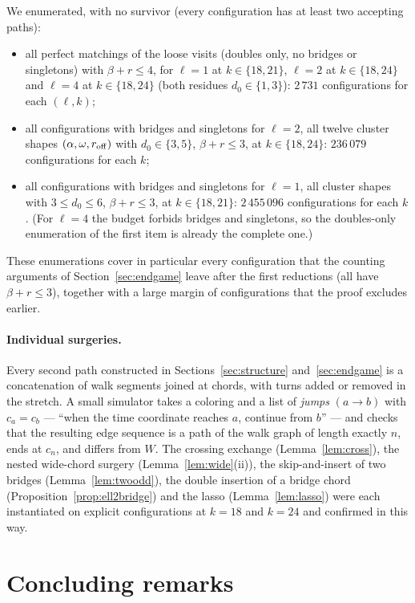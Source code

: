 \documentclass[11pt]{article}
\theoremstyle{definition}
\begin{document}
We enumerated, with no survivor (every configuration has at least two
accepting paths):
\begin{itemize}[leftmargin=1.6em,itemsep=1pt]
\item all perfect matchings of the loose visits (doubles only, no bridges or
singletons) with $\beta+r\le4$, for $\ell=1$ at $k\in\{18,21\}$, $\ell=2$
at $k\in\{18,24\}$ and $\ell=4$ at $k\in\{18,24\}$ (both residues
$d_0\in\{1,3\}$): $2\,731$ configurations for each $(\ell,k)$;
\item all configurations with bridges and singletons for $\ell=2$, all
twelve cluster shapes $(\alpha,\omega,r_{\rm off})$ with $d_0\in\{3,5\}$,
$\beta+r\le3$, at $k\in\{18,24\}$: $236\,079$ configurations for each $k$;
\item all configurations with bridges and singletons for $\ell=1$, all
cluster shapes with $3\le d_0\le6$, $\beta+r\le3$, at $k\in\{18,21\}$:
$2\,455\,096$ configurations for each $k$. (For $\ell=4$ the budget forbids
bridges and singletons, so the doubles-only enumeration of the first item is
already the complete one.)
\end{itemize}
These enumerations cover in particular every configuration that the
counting arguments of Section~\ref{sec:endgame} leave after the first
reductions (all have $\beta+r\le3$), together with a large margin of
configurations that the proof excludes earlier.

\paragraph{Individual surgeries.}
Every second path constructed in Sections~\ref{sec:structure}
and~\ref{sec:endgame} is a concatenation of walk segments joined at chords,
with turns added or removed in the stretch. A small simulator takes a
coloring and a list of \emph{jumps} $(a\to b)$ with $c_a=c_b$ --- ``when the
time coordinate reaches $a$, continue from $b$'' --- and checks that the
resulting edge sequence is a path of the walk graph of length exactly $n$,
ends at $c_n$, and differs from $W$. The crossing exchange
(Lemma~\ref{lem:cross}), the nested wide-chord surgery
(Lemma~\ref{lem:wide}(ii)), the skip-and-insert of two bridges
(Lemma~\ref{lem:twoodd}), the double insertion of a bridge chord
(Proposition~\ref{prop:ell2bridge}) and the lasso (Lemma~\ref{lem:lasso})
were each instantiated on explicit configurations at $k=18$ and $k=24$ and
confirmed in this way.
\section{Concluding remarks}
\end{document}
